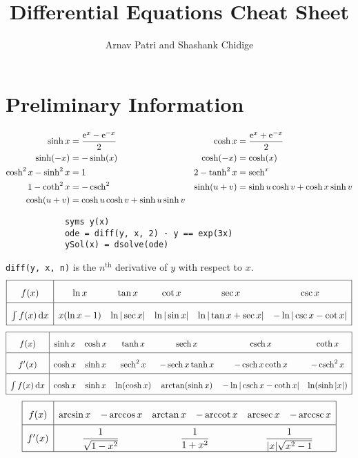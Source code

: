 \documentclass[12pt, A4]{article}
\title{Differential Equations Cheat Sheet}
\author{Arnav Patri and Shashank Chidige}
\date{}
\newcommand{\en}{\text{e}}
\newcommand{\supt}[2]{#1^{\text{#2}}}
\begin{document}
	\maketitle
	\tableofcontents
	\setcounter{section}{-1}
	\section{Preliminary Information}
		\begin{align*}
			\sinh x &= \frac{\en^x - \en^{-x}}{2} &
				\cosh x &= \frac{\en^x + \en^{-x}}{2} \\
			\sinh(-x) &= -\sinh(x) &
				\cosh(-x) &= \cosh(x) \\
			\cosh^2x - \sinh^2x &= 1 &
				2 - \tanh^2x &= \sech^x \\
			1 - \coth^2x &= -\csch^2 &
				\sinh(u + v) &= \sinh u \cosh v + \cosh x \sinh v \\
			\cosh(u + v) &= \cosh u \cosh v + \sinh u \sinh v
		\end{align*}
		\begin{verbatim}
			syms y(x)
			ode = diff(y, x, 2) - y == exp(3x)
			ySol(x) = dsolve(ode)
		\end{verbatim}
		\texttt{diff(y, x, n)} is the \(\supt{n}{th}\) derivative of \(y\) with respect to \(x\).
		\[\begin{array}{|c|*{5}{c}|}\hline
			f(x) & \ln x & \tan x & \cot x & \sec x & \csc x \\\hline
			\int f(x) \dd{x} & x(\ln x - 1) & \ln|\sec x| & \ln|\sin x| & \ln|\tan x + \sec x| & -\ln|\csc x - \cot x| \\\hline
		\end{array}\]
		\[\begin{array}{|c|*{6}{c}|}\hline
			f(x) & \sinh x & \cosh x & \tanh x & \sech x & \csch x & \coth x \\\hline
			f'(x) & \cosh x & \sinh x & \sech^2 x & -\sech x\tanh x & -\csch x \coth x & -\csch^2 x \\\hline
			\int f(x) \dd{x} &\cosh x & \sinh x & \ln(\cosh x) & \arctan(\sinh x) & -\ln|\csch x - \coth x| & \ln(\sinh|x|) \\\hline
		\end{array}\]
		\[\def\arraystretch{2}\begin{array}{|c|*{6}{c}|}\hline
			f(x) & \arcsin x & -\arccos x & \arctan x & -\arccot x & \arcsec x & -\arccsc x \\\hline
			f'(x) & \multicolumn{2}{c}{\dfrac{1}{\sqrt{1 - x^2}}} & \multicolumn{2}{c}{\dfrac{1}{1 + x^2}} & \multicolumn{2}{c|}{\dfrac{1}{|x|\sqrt{x^2 - 1}}} \\\hline
		\end{array}\]
\end{document}
